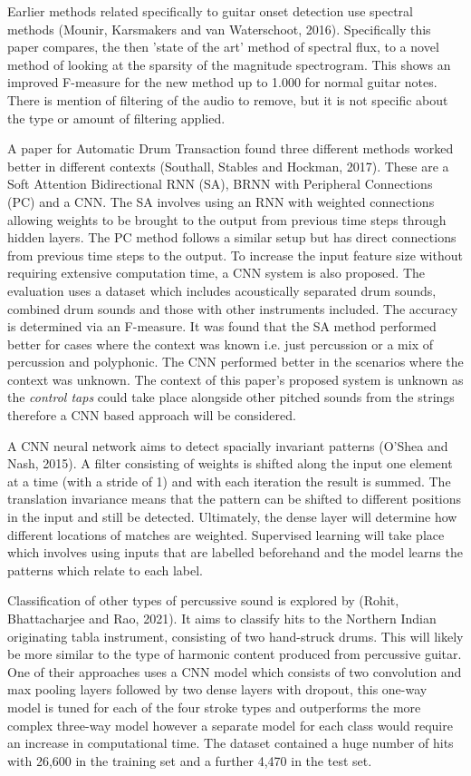 \documentclass[conference]{IEEEtran}
\begin{document}
Earlier methods related specifically to guitar onset detection use spectral methods (Mounir, Karsmakers and van Waterschoot, 2016). Specifically this paper compares, the then 'state of the art' method of spectral flux, to a novel method of looking at the sparsity of the magnitude spectrogram.
This shows an improved F-measure for the new method up to 1.000 for normal guitar notes. There is mention of filtering of the audio to remove, but it is not specific about the type or amount of filtering applied. 

A paper for Automatic Drum Transaction found three different methods worked better in different contexts (Southall, Stables and Hockman, 2017). These are a Soft Attention Bidirectional RNN (SA), BRNN with Peripheral Connections (PC) and a CNN.
The SA involves using an RNN with weighted connections allowing weights to be brought to the output from previous time steps through hidden layers. The PC method follows a similar setup but has
direct connections from previous time steps to the output. To increase the input feature size without requiring extensive computation time, a CNN system is also proposed. The evaluation uses a dataset which includes acoustically
separated drum sounds, combined drum sounds and those with other instruments included. The accuracy is determined via an F-measure. 
It was found that the SA method performed better for cases where the context was known i.e. just percussion or a mix of percussion and polyphonic. The CNN performed better in the 
scenarios where the context was unknown. The context of this paper's proposed system is unknown as the \emph{control taps} could take place alongside other pitched sounds from the strings
therefore a CNN based approach will be considered. 

A CNN neural network aims to detect spacially invariant patterns (O'Shea and Nash, 2015). A filter consisting of weights is shifted along the input one element at a time (with a stride of 1) and with each iteration the result is summed.
The translation invariance means that the pattern can be shifted to different positions in the input and still be detected. Ultimately, the dense layer will determine how different locations of matches
are weighted. Supervised learning will take place which involves using inputs that are labelled beforehand and the model learns the patterns which relate to each label.

Classification of other types of percussive sound is explored by (Rohit, Bhattacharjee and Rao, 2021). It aims to classify hits to the Northern Indian originating tabla instrument, consisting of two hand-struck drums. This will likely be more similar to the
type of harmonic content produced from percussive guitar. One of their approaches uses a CNN model which consists of two convolution and max pooling layers followed by two dense layers with dropout, this one-way model
is tuned for each of the four stroke types and outperforms the more complex three-way model however a separate model for each class would require an increase in computational time. The dataset contained a huge number of hits with 26,600 in the training set and a further 4,470 in the test set. 
\end{document}
